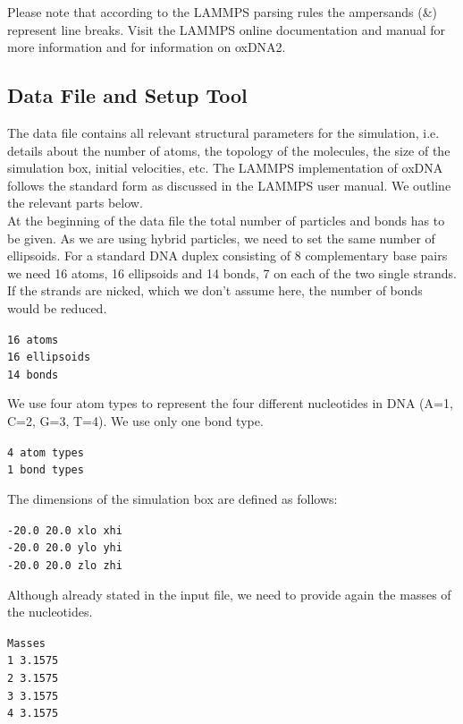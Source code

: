 \documentclass[12pt,onecolumn]{article}
\begin{document}
Please note that according to the LAMMPS parsing rules the ampersands (\&) represent line breaks.
Visit the LAMMPS online documentation and manual for more information and for information on oxDNA2.

\subsection{Data File and Setup Tool}\label{data_setup}

The data file contains all relevant structural parameters for the simulation, i.e. details about 
the number of atoms, the topology of the molecules, the size of the simulation box, initial velocities, etc. 
The LAMMPS implementation of oxDNA follows the standard form as discussed in the LAMMPS user manual. 
We outline the relevant parts below.\\

\noindent At the beginning of the data file the total number of particles and bonds has to be given. As we are using
hybrid particles, we need to set the same number of ellipsoids. For a standard DNA duplex consisting
of 8 complementary base pairs we need 16 atoms, 16 ellipsoids and 14 bonds, 7 on each of the two single strands.
If the strands are nicked, which we don't assume here, the number of bonds would be reduced. 

\smallskip
\texttt{16 atoms\\
16 ellipsoids\\
14 bonds\\
}
\smallskip

\noindent We use four atom types to represent the four different nucleotides in DNA (A=1, C=2, G=3, T=4). 
We use only one bond type.

\smallskip
\texttt{4 atom types\\
1 bond types
}
\smallskip

\noindent The dimensions of the simulation box are defined as follows:

\smallskip
\texttt{-20.0 20.0 xlo xhi\\
-20.0 20.0 ylo yhi\\
-20.0 20.0 zlo zhi\\
}
\smallskip

\noindent Although already stated in the input file, we need to provide again the masses of the nucleotides.

\smallskip
\texttt{Masses\\
\vspace*{0.3cm}
1 3.1575\\
2 3.1575\\
3 3.1575\\
4 3.1575\\
}
\smallskip
\end{document}
